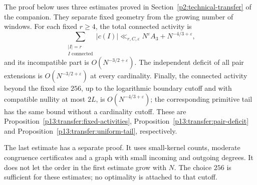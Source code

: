 The proof below uses three estimates proved in
Section~\ref{p2:technical-transfer} of the companion. They separate
fixed geometry from the growing number of windows.
For each fixed $r\ge4$, the total connected activity is
\[
 \sum_{\substack{|I|=r\\I\text{ connected}}}|c(I)|
 \ll_{r,C,\varepsilon}N^\varepsilon A_3+N^{-4/3+\varepsilon},
\]
and its incompatible part is $O(N^{-3/2+\varepsilon})$.
The independent deficit of all pair extensions is
$O(N^{-3/2+\varepsilon})$ at every cardinality.
Finally, the connected activity beyond the fixed size $256$,
up to the logarithmic boundary cutoff and with compatible nullity
at most $2L$, is $O(N^{-4/3+\varepsilon})$; the corresponding
primitive tail has the same bound without a cardinality cutoff.
These are Proposition~\ref{p13:transfer:fixed-activities},
Proposition~\ref{p13:transfer:pair-deficit} and
Proposition~\ref{p13:transfer:uniform-tail}, respectively.

The last estimate has a separate proof. It uses small-kernel counts,
moderate congruence certificates and a graph with small incoming and
outgoing degrees. It does not let the order in the first estimate
grow with $N$. The choice $256$ is sufficient for these estimates;
no optimality is attached to that cutoff.

